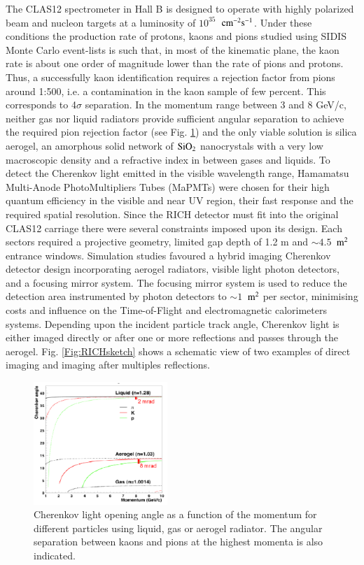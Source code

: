 \documentclass[5p,times,twocolumn]{elsarticle}
\begin{document}
The CLAS12 spectrometer in Hall B is designed to operate with highly polarized beam and nucleon targets at a luminosity of $10^{35}$~$\rm cm^{-2}s^{-1}$. Under these conditions the production rate of protons, kaons and pions studied using SIDIS Monte Carlo event-lists is such that, in most of the kinematic plane, the kaon rate is about one order of magnitude lower than the rate of pions and protons. Thus, a successfully kaon identification requires a rejection factor from pions around 1:500, i.e. a contamination in the kaon sample of few percent. This corresponds to 4$\sigma$ separation.
In the momentum range between 3 and 8 GeV/c, neither gas nor liquid radiators provide sufficient angular separation to achieve the required pion rejection factor (see Fig. \ref{Fig:Radiators}) and the only viable solution is silica aerogel, an amorphous solid
network of $\rm SiO_2$ nanocrystals with a very low macroscopic density and a refractive index in between gases and liquids.
To detect the Cherenkov light emitted in the visible wavelength range, Hamamatsu Multi-Anode PhotoMultipliers Tubes (MaPMTs) were chosen for their high quantum efficiency in the visible and near UV region, their fast response and the required spatial resolution. Since the RICH detector must fit into the original CLAS12 carriage there were several constraints imposed upon its design. Each sectors required a projective geometry, limited gap depth of 1.2 m and $\sim 4.5$~$\rm m^2$ entrance windows.
Simulation studies favoured a hybrid imaging Cherenkov detector design incorporating aerogel radiators, visible light photon detectors, and a focusing mirror system. The focusing mirror system is used to reduce the detection area instrumented by photon detectors to $\sim 1$~$\rm m^2$ per sector, minimising costs and influence on the Time-of-Flight and electromagnetic calorimeters systems.
Depending upon the incident particle track angle, Cherenkov light is either imaged directly or after one or more reflections and passes through the aerogel. Fig. \ref{Fig:RICHsketch} shows a schematic view of two examples of direct imaging and imaging after multiples reflections.

\begin{figure}
\begin{center}
\includegraphics[width=0.45\textwidth]{Radiators.pdf}
\caption{Cherenkov light opening angle as a function of the momentum for different particles using liquid, gas or aerogel radiator. The angular separation between kaons and pions at the highest momenta is also indicated.}
\label{Fig:Radiators}
\end{center}
\end{figure}
\end{document}
